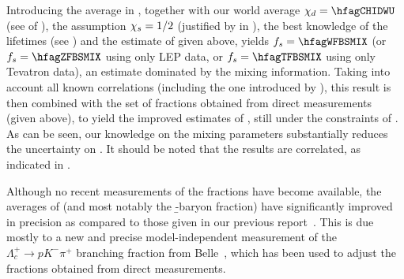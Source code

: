 Introducing the \chibar average in , together with our world average 
$\chid = \hfagCHIDWU$ (see  of ), the assumption $\chi_{s}= 1/2$ 
(justified by  in ), the 
best knowledge of the lifetimes (see ) and the estimate of \fbb given above, 
yields $\fBs = \hfagWFBSMIX$ 
(or $\fBs = \hfagZFBSMIX$ using only LEP data, 
or $\fBs = \hfagTFBSMIX$ using only Tevatron data),
an estimate dominated by the mixing information. 
Taking into account all known correlations (including the one introduced by \fbb), 
this result is then combined with the set of fractions obtained from direct measurements 
(given above), to yield the %
improved estimates of , 
still under the constraints of .
As can be seen, our knowledge on the mixing parameters 
substantially reduces the uncertainty on \fBs.
It should be noted that the results %
are correlated, as indicated in .

Although no recent measurements of the fractions have become available, 
the averages of  (and most notably the \b-baryon fraction) 
have significantly improved in precision as compared to those given in our 
previous report~\cite{Amhis:2012bh}. This is due mostly to a new and precise 
model-independent measurement of the $\Lambda_c^+ \to p K^-\pi^+$
branching fraction from Belle~\cite{Zupanc:2013iki}, 
which has been used to adjust the fractions obtained from direct measurements. 





